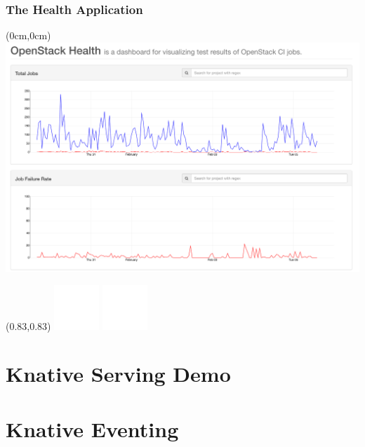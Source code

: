 \documentclass[aspectratio=169,11pt,hyperref={colorlinks=true}]{beamer}
\begin{document}
\begin{lblackrwhiteframe}
\begin{lblackrwhiteframe}
\begin{grayframe}
  \frametitle{The Health Application}
  \begin{textblock*}{\paperwidth}(0cm,0cm)
    \includegraphics[width=\paperwidth, height=\paperheight]{img/openstack-health.png}
  \end{textblock*}
  \begin{textblock*}{0.2\paperwidth}(0.83\paperwidth,0.83\paperheight)
    \includegraphics[width=0.03\paperwidth]{img/cc.png}
    \includegraphics[width=0.03\paperwidth]{img/zero.png}
  \end{textblock*}
\end{grayframe}

\section{Knative Serving Demo}

\section{Knative Eventing}


\end{lblackrwhiteframe}
\end{lblackrwhiteframe}
\end{document}
